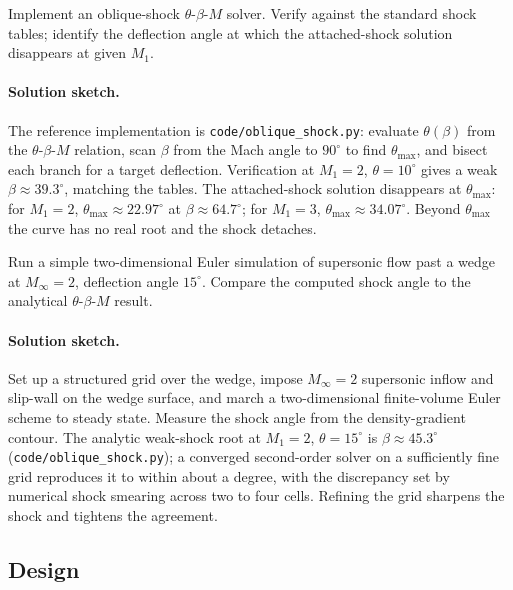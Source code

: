 \begin{exercise}
Implement an oblique-shock $\theta$-$\beta$-$M$ solver. Verify
against the standard shock tables; identify the deflection
angle at which the attached-shock solution disappears at given
$M_1$.
\paragraph{Solution sketch.} The reference implementation is
\texttt{code/oblique\_shock.py}: evaluate $\theta(\beta)$ from the
$\theta$-$\beta$-$M$ relation, scan $\beta$ from the Mach angle to
$90^{\circ}$ to find $\theta_{\max}$, and bisect each branch for a
target deflection. Verification at $M_1 = 2$, $\theta = 10^{\circ}$
gives a weak $\beta \approx 39.3^{\circ}$, matching the tables. The
attached-shock solution disappears at $\theta_{\max}$: for $M_1 = 2$,
$\theta_{\max} \approx 22.97^{\circ}$ at $\beta \approx 64.7^{\circ}$;
for $M_1 = 3$, $\theta_{\max} \approx 34.07^{\circ}$. Beyond
$\theta_{\max}$ the curve has no real root and the shock detaches.
\end{exercise}

\begin{exercise}
Run a simple two-dimensional Euler simulation of supersonic flow
past a wedge at $M_\infty = 2$, deflection angle $15^{\circ}$.
Compare the computed shock angle to the analytical
$\theta$-$\beta$-$M$ result.
\paragraph{Solution sketch.} Set up a structured grid over the wedge,
impose $M_\infty = 2$ supersonic inflow and slip-wall on the wedge
surface, and march a two-dimensional finite-volume Euler scheme to
steady state. Measure the shock angle from the density-gradient
contour. The analytic weak-shock root at $M_1 = 2$, $\theta =
15^{\circ}$ is $\beta \approx 45.3^{\circ}$
(\texttt{code/oblique\_shock.py}); a converged second-order solver on
a sufficiently fine grid reproduces it to within about a degree, with
the discrepancy set by numerical shock smearing across two to four
cells. Refining the grid sharpens the shock and tightens the
agreement.
\end{exercise}

\subsection*{Design}

